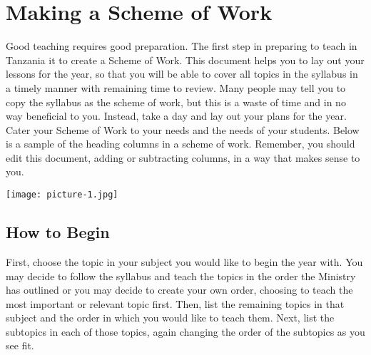 \chapter{Making a Scheme of Work}
Good teaching requires good preparation.  The first step in preparing to teach in Tanzania it to create a Scheme of Work. This document helps you to lay out your lessons for the year, so that you will be able to cover all topics in the syllabus in a timely manner with remaining time to review.  Many people may tell you to copy the syllabus as the scheme of work, but this is a waste of time and in no way beneficial to you.  Instead, take a day and lay out your plans for the year.   Cater your Scheme of Work to your needs and the needs of your students. Below is a sample of the heading columns in a scheme of work. Remember, you should edit this document, adding or subtracting columns, in a way that makes sense to you.

\begin{flushleft}
\texttt{[image: picture-1.jpg]} 
\end{flushleft}


\section{How to Begin}
First, choose the topic in your subject you would like to begin the year with.  You may decide to follow the syllabus and teach the topics in the order the Ministry has outlined or you may decide to create your own order, choosing to teach the most important or relevant topic first.  Then, list the remaining topics in that subject and the order in which you would like to teach them.  Next, list the subtopics in each of those topics, again changing the order of the subtopics as you see fit.\\

